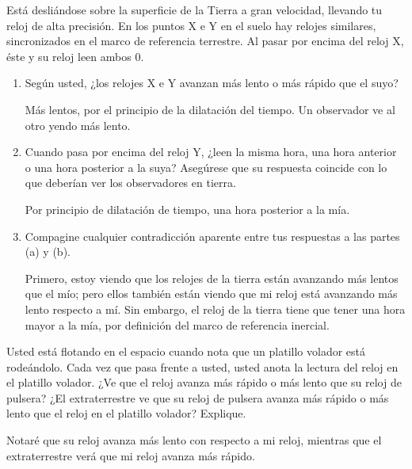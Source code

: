 





\begin{problema}
    Está  desliándose  sobre  la  superficie  de  la  Tierra  a  gran  velocidad,  llevando  tu  reloj  de  alta precisión.  En  los  puntos  X  e  Y  en  el  suelo  hay  relojes  similares, sincronizados  en  el  marco  de referencia terrestre. Al pasar por encima del reloj X, éste y su reloj leen ambos 0.  
\begin{enumerate}
    \item Según usted, ¿los relojes X e Y avanzan más lento o más rápido que el suyo?   
    \begin{sol}
        Más lentos, por el principio de la dilatación del tiempo. Un observador ve al otro yendo más lento. 
    \end{sol}
    \item Cuando pasa por encima del reloj Y, ¿leen la misma hora, una hora anterior o una hora posterior a la suya? Asegúrese que su respuesta coincide con lo que deberían ver los observadores en tierra. 
    \begin{sol}
        Por principio de dilatación de tiempo, una hora posterior a la mía. 
    \end{sol}
    \item Compagine cualquier contradicción aparente entre tus respuestas a las partes (a) y (b). 
    \begin{sol}
        Primero, estoy viendo que los relojes de la tierra están avanzando más lentos que el mío; pero ellos también están viendo que mi reloj está avanzando más lento respecto a mí. Sin embargo, el reloj de la tierra tiene que tener una hora mayor a la mía, por definición del marco de referencia inercial. 
    \end{sol}
\end{enumerate}

 
\end{problema}

\begin{problema}
    Usted está flotando en el espacio cuando nota que un platillo volador está rodeándolo. Cada vez que pasa frente a usted, usted anota la lectura del reloj en el platillo volador. ¿Ve que el reloj avanza más rápido o más lento que su reloj de pulsera? ¿El extraterrestre ve que su reloj de pulsera avanza más rápido o más lento que el reloj en el platillo volador? Explique. 
    \begin{sol}
        Notaré que su reloj avanza más lento con respecto a mi reloj, mientras que el extraterrestre verá que mi reloj avanza más rápido. 
    \end{sol}
\end{problema}


